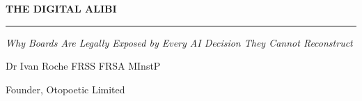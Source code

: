 \begin{titlepage}
\centering
\vspace*{2.2cm}
{\color{crimson}\fontsize{34}{38}\selectfont\bfseries THE DIGITAL ALIBI\par}
\vspace{0.6cm}
{\color{gold}\rule{6cm}{1.2pt}\par}
\vspace{0.8cm}
{\large\itshape Why Boards Are Legally Exposed by Every AI Decision They Cannot Reconstruct\par}
\vfill
{\Large Dr Ivan Roche FRSS FRSA MInstP\par}
\vspace{0.3cm}
{\sffamily\small Founder, Otopoetic Limited\par}
\vspace*{1.5cm}
\end{titlepage}

